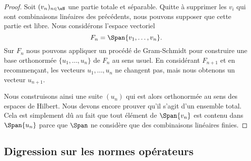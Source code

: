 \begin{proof}
    Soit \( (v_n)_{n\in \eN}\) une partie totale et séparable. Quitte à supprimer les \( v_i\) qui sont combinaisons linéaires des précédents, nous pouvons supposer que cette partie est libre. Nous considérons l'espace vectoriel
    \begin{equation}
        F_n=\Span\{ v_1,\ldots, v_n \}.
    \end{equation}
    Sur \( F_n\) nous pouvons appliquer un procédé de Gram-Schmidt pour construire une base orthonormée \( \{ u_1,\ldots, u_n \}\) de \( F_n\) au sens usuel. En considérant \( F_{n+1}\) et en recommençant, les vecteurs \( u_1,\ldots, u_n\) ne changent pas, mais nous obtenons un vecteur \( u_{n+1}\).

    Nous construisons ainsi une suite \( (u_n)\) qui est alors orthonormée au sens des espaces de Hilbert. Nous devons encore prouver qu'il s'agit d'un ensemble total. Cela est simplement dû au fait que tout élément de \( \Span\{ v_n \}\) est contenu dans \( \Span\{ u_n \}\) parce que \( \Span\) ne considère que des combinaisons linéaires finies.
\end{proof}

\subsection{Digression sur les normes opérateurs}
\label{subsecaeSywF}

